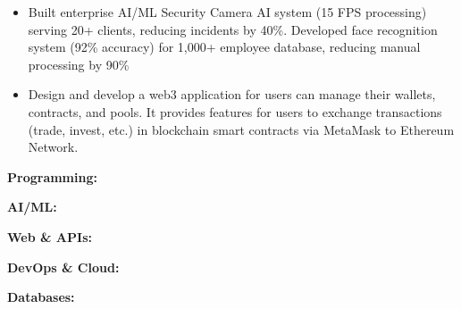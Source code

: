 \documentclass[10pt,a4paper,ragged2e,withhyper]{altacv}
\begin{document}
\smallskip

\begin{itemize}[leftmargin=*,noitemsep,topsep=0pt]
    \item Built enterprise AI/ML Security Camera AI system (15 FPS processing) serving 20+ clients, reducing incidents by 40\%. Developed face recognition system (92\% accuracy) for 1,000+ employee database, reducing manual processing by 90\%
\end{itemize}

\begin{itemize}[leftmargin=*,noitemsep,topsep=0pt]
    \item Design and develop a web3 application for users can manage their wallets, contracts, and pools. It provides features for users to exchange transactions (trade, invest, etc.) in blockchain smart contracts via MetaMask to Ethereum Network.
\end{itemize}

\smallskip


  \textbf{Programming:}       

\smallskip
  	\textbf{AI/ML:}        

\smallskip
  
  \textbf{Web \& APIs:}       

\smallskip
  \textbf{DevOps \& Cloud:}       

\smallskip
  \textbf{Databases:}         

\medskip

\end{document}
